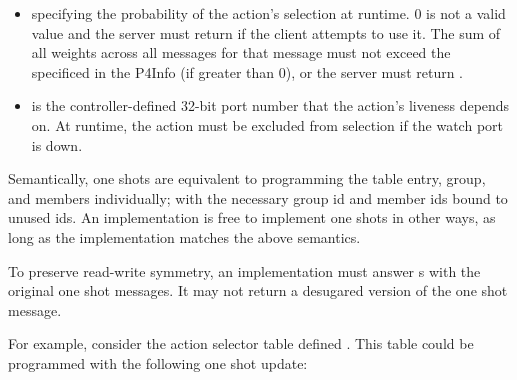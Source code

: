 \documentclass[11pt]{article}
\begin{document}
{\begin{itemize}
\item{}
 specifying the probability of the action's selection at runtime. 0 is
not a valid  value and the server must return  if
the client attempts to use it. The sum of all weights across all
 messages for that  message must
not exceed the  specificed in the P4Info (if greater than 0),
or the server must return .%

\item{}
 is the controller-defined 32-bit port number that the action's
liveness depends on. At runtime, the action must be excluded from selection if
the watch port is down.%
\end{itemize}%

\noindent{}Semantically, one shots are equivalent to programming the table entry, group,
and members individually; with the necessary group id and member ids bound to
unused ids. An implementation is free to implement one shots in other ways, as
long as the implementation matches the above semantics.%

To preserve read-write symmetry, an implementation must answer s
with the original one shot messages. It may not return a desugared version of
the one shot message.%

For example, consider the action selector table defined
. This table could be programmed
with the following one shot update:%

}
\end{document}
